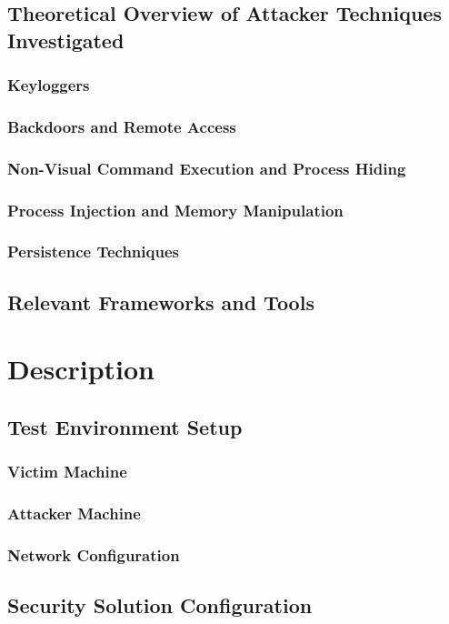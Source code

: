 \documentclass[11pt]{article}
\begin{document}
			\subsection{Theoretical Overview of Attacker Techniques Investigated}
				\subsubsection{Keyloggers}
				\subsubsection{Backdoors and Remote Access}
				\subsubsection{Non-Visual Command Execution and Process Hiding}
				\subsubsection{Process Injection and Memory Manipulation}
				\subsubsection{Persistence Techniques}
			\subsection{Relevant Frameworks and Tools}
			
		\section{Description}
			\subsection{Test Environment Setup}
				\subsubsection{Victim Machine}
				\subsubsection{Attacker Machine}
				\subsubsection{Network Configuration}
			\subsection{Security Solution Configuration}
\end{document}
